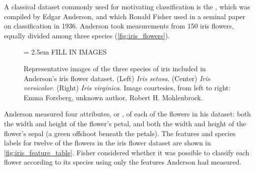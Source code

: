 A classical dataset commonly used for motivating classification is the , which was compiled by Edgar Anderson, and which Ronald Fisher used in a seminal paper on classification in 1936. Anderson took measurements from 150 iris flowers, equally divided among three species (\autoref{fig:iris_flowers}).\\

\begin{figure}[h]
\centering
\tabcolsep = 2.5em
\mySfFamily
 FILL IN IMAGES

\caption{Representative images of the three species of iris included in Anderson's iris flower dataset. (Left) \textit{Iris setosa}. (Center)  \textit{Iris versicolor}. (Right) \textit{Iris virginica}. Image courtesies, from left to right: Emma Forsberg, unknown author, Robert H. Mohlenbrock.}
\label{fig:iris_flowers}
\end{figure}

Anderson measured four attributes, or , of each of the flowers in his dataset: both the width and height of the flower's petal, and both the width and height of the flower's sepal (a green offshoot beneath the petals). The features and species labels for twelve of the flowers in the iris flower dataset are shown in \autoref{fig:iris_feature_table}. Fisher considered whether it was possible to classify each flower according to its species using only the features Anderson had measured.\\

